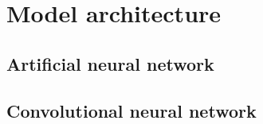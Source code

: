 \section{Model architecture}

\subsection{Artificial neural network}

\subsection{Convolutional neural network}